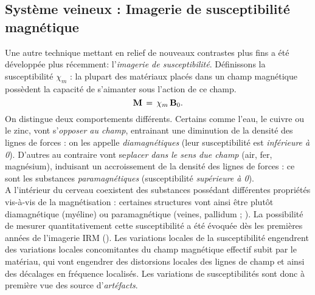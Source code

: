 \subsection{Système veineux : Imagerie de susceptibilité magnétique}
\label{sec:QSM_chap_2}
Une autre technique mettant en relief de nouveaux contrastes plus fins a été développée plus récemment: l’{\em imagerie de susceptibilité}. Définissons la susceptibilité $\chi_m$ : la plupart des matériaux placés dans un champ magnétique possèdent la capacité de s’aimanter sous l’action de ce  champ. 
\begin{equation}
\bold{M}\,=\,\chi_m\,\bold{B}_0.
\end{equation}
On distingue deux comportements différents. Certains comme l’eau, le cuivre ou le zinc, vont s’{\em opposer au champ}, entrainant une diminution de la densité des lignes de forces : on les appelle {\em diamagnétiques} (leur susceptibilité est {\em inférieure à 0}). D’autres au contraire vont se{\em placer dans le sens due champ} (air, fer, magnésium), induisant un accroissement de la densité des lignes de forces : ce sont les substances {\em paramagnétiques} (susceptibilité {\em supérieure à 0}).\\
A l’intérieur du cerveau coexistent des substances possédant différentes propriétés vis-à-vis de la magnétisation : certaines structures vont ainsi être plutôt diamagnétique (myéline) ou paramagnétique (veines, pallidum ; \cite{Wang_Liu_2014}). La possibilité de mesurer quantitativement cette susceptibilité a été évoquée dès les premières années de l’imagerie IRM (\cite{Young1987}). Les variations locales de la susceptibilité engendrent des variations locales concomitantes du champ magnétique effectif subit par le matériau, qui vont engendrer des distorsions locales des lignes de champ et ainsi des décalages en fréquence localisés. Les variations de susceptibilités sont donc à première vue des source d’{\em artéfacts}.  
